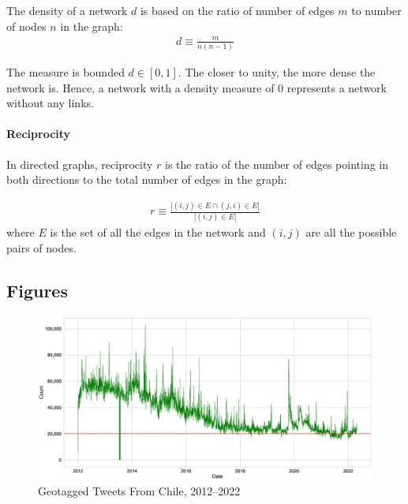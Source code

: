         The density  of a network $d$ is based on the ratio of number of edges $m$ to number of nodes $n$ in the graph:%
        \begin{align}
            d \equiv \frac{m}{n(n-1)}
        \end{align}

        The measure is bounded $d \in [0,1]$. The closer to unity, the more dense the network is. Hence, a network with a density measure of 0 represents a network without any links.
        
        \paragraph{Reciprocity} 
        In directed graphs, reciprocity $r$ is the ratio of the number of edges pointing in both directions to the total number of edges in the graph: 
        
        \begin{align}
            r \equiv \frac{|{(i,j) \in E \cap (j,i) \in E}| }{|{(i,j) \in E}|}
        \end{align}
        where $E$ is the set of all the edges in the network and $(i,j)$ are all the possible pairs of nodes.
        

    
    
    
    \subsection{Figures}
        \begin{figure}[!htb]
            \centering
            \includegraphics[width = 15cm]{figs/location_tweets_chile_2012_2022}
            \caption{Geotagged Tweets From Chile, 2012--2022}
            \label{appfig_loc_twit_chi_12_22}
        \end{figure}
        
